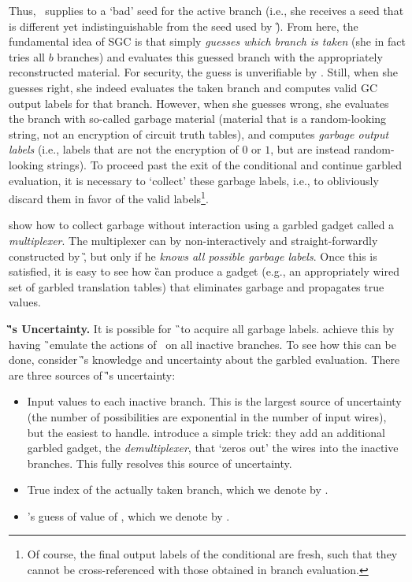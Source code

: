 Thus, \HK\ supplies to \E a `bad' seed for the active branch (i.e.,
she receives a seed that is different yet indistinguishable from the
seed used by \G).
From here, the fundamental idea of SGC is that \E
simply \emph{guesses which branch is taken} (she in fact tries  all $b$
branches) and evaluates this guessed branch with the appropriately reconstructed material.
For security, the guess is unverifiable by \E. 
Still, when she guesses right, she indeed evaluates the taken branch and
computes valid GC output labels for that branch.
However, when she guesses wrong, she evaluates the branch
with so-called garbage material (material that is a random-looking string, not
an encryption of circuit truth tables), and computes
\emph{garbage output labels} (i.e., labels that are not the encryption
of $0$ or $1$, but are instead random-looking strings).
%
To proceed past the exit of the conditional and continue garbled evaluation, it is necessary to
`collect'  these garbage labels, i.e., to obliviously  discard them in favor of the valid
labels\footnote{Of course, the final output labels of the conditional
  are fresh,  such that they cannot be cross-referenced with those
obtained in branch evaluation.}.


\HK show how to collect garbage without
interaction using a garbled gadget called a \emph{multiplexer}.
%
The multiplexer can by non-interactively and straight-forwardly constructed by \G,
but only if he \emph{knows all possible garbage labels}.
Once this is satisfied, it is easy to see how \G can produce a gadget
(e.g., an appropriately wired set of garbled translation tables)
that eliminates garbage and propagates true values.


{\bf \G's Uncertainty.}
It is possible for \G\ to acquire all garbage labels.
\HK achieve this by having \G\ emulate the actions of \E\
 on all inactive branches.
To see how this can be done,
 consider \G's knowledge and uncertainty about the garbled evaluation.
 There are three sources of \G's uncertainty:
\begin{itemize}
  \item Input values to each inactive branch.
    This is the largest source of uncertainty (the number of
    possibilities are exponential in the number of input wires), but
    the easiest to handle.  \HK introduce a simple trick:
    they add an additional garbled gadget, the \emph{demultiplexer},
    that `zeros out' the wires into the inactive branches.
    This fully resolves this source of uncertainty.
  \item True index of the actually taken branch, which we denote by \truth.
  \item \E's guess of value of \truth, which we denote by \guess.
\end{itemize}

